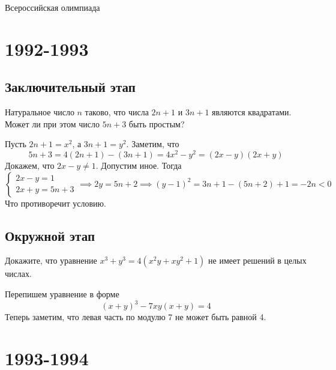 \documentclass[11pt, a4paper]{common/document_template}
\begin{document}
\begin{titlepage}
  \begin{center}
	\Huge{Всероссийская олимпиада}
  \end{center}
\end{titlepage} 

\chapter{1992-1993}

\section{Заключительный этап}

\begin{exercise}
Натуральное число $n$ таково, что числа $2n + 1$ и $3n + 1$ являются
квадратами. Может ли при этом число $5n + 3$ быть простым?
\end{exercise}

\begin{Solution}
Пусть $2n+1=x^{2}$, а $3n+1 = y^{2}$. Заметим, что
$$
5n+3 = 4(2n+1) - (3n+1) = 4x^{2} - y^{2} = (2x - y)(2x + y)
$$
Докажем, что $2x - y \neq 1$. Допустим иное. Тогда
$$
\begin{cases}
2x - y = 1 \\
2x + y = 5n + 3
\end{cases} \implies 2y = 5n + 2 \implies (y - 1)^{2} = 3n+1 - (5n + 2) + 1 = -2n < 0
$$
Что противоречит условию.
\end{Solution}

\section{Окружной этап}

\begin{exercise}
Докажите, что уравнение $x^{3} + y^{3} = 4(x^{2} y + xy^{2} + 1)$ не имеет решений в целых числах.
\end{exercise}

\begin{Solution}
Перепишем уравнение в форме
$$
(x + y)^{3} - 7xy(x + y) = 4
$$
Теперь заметим, что левая часть по модулю 7 не может быть равной 4. 
\end{Solution}

\chapter{1993-1994}
\end{document}
